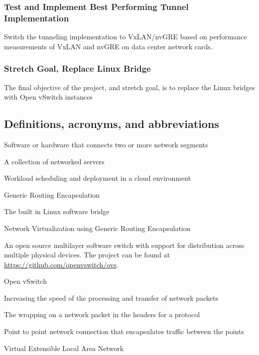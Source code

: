 \documentclass[10pt,letterpaper,onecolumn,draftclsnofoot]{IEEEtran}
\begin{document}
\subsubsection{Test and Implement Best Performing Tunnel Implementation}
Switch the tunneling implementation to VxLAN/nvGRE based on performance measurements of VxLAN and nvGRE
on data center network cards.
\subsubsection{Stretch Goal, Replace Linux Bridge}
The final objective of the project, and stretch goal, is to replace the Linux bridges with Open
vSwitch instances

\subsection{Definitions, acronyms, and abbreviations}
\begin{description}[leftmargin=12em,style=nextline]
    \item[Bridge]
	    Software or hardware that connects two or more network segments
    \item [Cloud] 
	    A collection of networked servers
	\item[Cloud Orchestration]
		Workload scheduling and deployment in a cloud environment
	\item[GRE] 
		Generic Routing Encapsulation
    \item[Linux Bridge]
	    The built in Linux software bridge
    \item[nvGRE] 
	    Network Virtualization using Generic Routing Encapsulation
    \item [Open vSwitch] 
	    An open source multilayer software switch with support for distribution across multiple physical devices. 
	    The project can be found at \url{https://github.com/openvswitch/ovs}.
	\item[OVS] 
		Open vSwitch 
    \item[Packet Acceleration] 
	    Increasing the speed of the processing and transfer of network packets
    \item[Packet Encapsulation]
	    The wrapping on a network packet in the headers for a protocol
    \item [Tunnel]
	    Point to point network connection that encapsulates traffic between the points
    \item[VxLAN] 
	    Virtual Extensible Local Area Network
\end{description}
\end{document}
